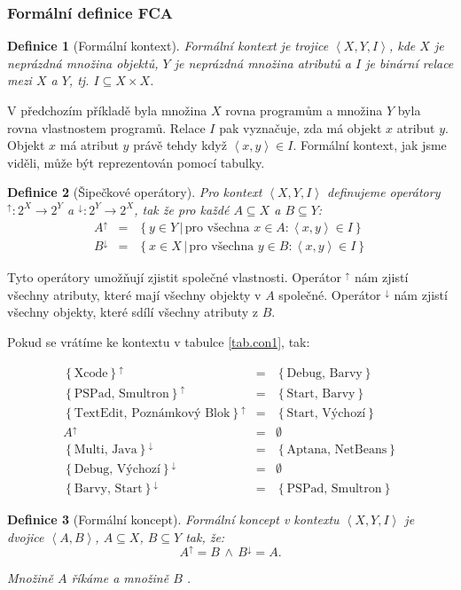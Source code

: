 \documentclass[12pt]{article}
\newcommand{\sep}{\,|\,}
\newcommand{\foreach}{\mbox{pro všechna }}
\newcommand{\sssection}[1]{\subsubsection{#1}}
\newcommand{\adds}[1]{\left\{#1\right\}}
\newcommand{\addsp}[1]{\left<#1\right>}
\newcommand{\logand}{\,\wedge\,}
\newcommand{\context}{\addsp{X, Y, I}}
\newcommand{\AB}{\addsp{A, B}}
\newcommand{\up}{^{\uparrow}}
\newcommand{\down}{^{\downarrow}}
\newtheorem{mydef}{Definice}
\begin{document}
\sssection{Formální definice FCA}

\begin{mydef}[Formální kontext]
Formální kontext je trojice $\addsp{X, Y, I}$, kde $X$ je neprázdná množina objektů, $Y$ je neprázdná množina atributů a $I$ je binární relace mezi $X$ a $Y$, tj. $I\subseteq X\times X$.
\end{mydef}

V předchozím příkladě byla množina $X$ rovna programům a množina $Y$ byla rovna vlastnostem programů. Relace $I$ pak vyznačuje, zda má objekt $x$ atribut $y$. Objekt $x$ má atribut $y$ právě tehdy když $\addsp{x, y}\in I$. Formální kontext, jak jsme viděli, může být reprezentován pomocí tabulky. 

\begin{mydef}[Šipečkové operátory]
Pro kontext $\context$ definujeme operátory $\up:2^X\rightarrow2^Y$ a $\down:2^Y\rightarrow2^X$, tak že pro každé $A\subseteq X$ a $B\subseteq Y$:
\begin{eqnarray}
A\up&=&\adds{y\in Y\sep \foreach x \in A: \addsp{x, y}\in I}\\
B\down&=&\adds{x\in X\sep\foreach y\in B:\addsp{x, y} \in I}
\end{eqnarray}
\end{mydef}

Tyto operátory umožňují zjistit společné vlastnosti. Operátor $\up$ nám zjistí všechny atributy, které mají všechny objekty v $A$ společné. Operátor $\down$ nám zjistí všechny objekty, které sdílí všechny atributy z $B$. 

Pokud se vrátíme ke kontextu v tabulce \ref{tab.con1}, tak:

\begin{eqnarray*}
\adds{\mbox{Xcode}}\up&=&\adds{\mbox{Debug, Barvy}}\\
\adds{\mbox{PSPad, Smultron}}\up&=&\adds{\mbox{Start, Barvy}}\\
\adds{\mbox{TextEdit, Poznámkový Blok}}\up&=&\adds{\mbox{Start, Výchozí}}\\
A\up&=&\emptyset\\
\adds{\mbox{Multi, Java}}\down&=&\adds{\mbox{Aptana, NetBeans}}\\
\adds{\mbox{Debug, Výchozí}}\down&=&\emptyset\\
\adds{\mbox{Barvy, Start}}\down&=&\adds{\mbox{PSPad, Smultron}}
\end{eqnarray*}

\begin{mydef}[Formální koncept]
Formální koncept v kontextu $\context$ je dvojice $\AB$, $A\subseteq X$, $B\subseteq Y$ tak, že:
$$A\up=B\logand B\down =A.$$

Množině $A$ říkáme  a množině $B$ .
\end{mydef}
\end{document}
